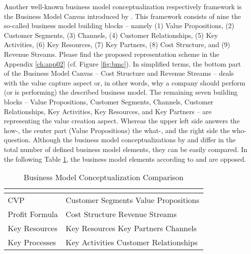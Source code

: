 Another well-known business model conceptualization respectively framework is the Business Model Canvas introduced by \citet{Osterwalder2010}. This framework consists of nine the so-called business model building blocks -- namely (1) Value Propositions, (2) Customer Segments, (3) Channels, (4) Customer Relationships, (5) Key Activities, (6) Key Resources, (7) Key Partners, (8) Cost Structure, and (9) Revenue Streams. Please find the proposed representation scheme in the Appendix \ref{ch:app02} (cf. Figure \ref{fig:bmc}). In simplified terms, the bottom part of the Business Model Canvas -- Cost Structure and Revenue Streams -- deals with the value capture aspect or, in other words, why a company should perform (or is performing) the described business model. The remaining seven building blocks -- Value Propositions, Customer Segments, Channels, Customer Relationships, Key Activities, Key Resources, and Key Partners -- are representing the value creation aspect. Whereas the upper left side answers the how-, the center part (Value Propositions) the what-, and the right side the who-question. Although the business model conceptualizations by \citet{Johnson2008} and \citet{Osterwalder2010} differ in the total number of defined business model elements, they can be easily compared. In the following Table \ref{tab:bmcc}, the business model elements according to \citet{Johnson2008} and \citet{Osterwalder2010} are opposed.

\begin{table}[h]
	\centering
	\begin{tabular}{lp{}}
			\citet{Johnson2008} & \citet{Osterwalder2010}\\ \hline
			\ac{CVP}	& Customer Segments \newline Value Propositions\\ \hline
			Profit Formula	& Cost Structure \newline	Revenue Streams\\ \hline
			Key Resources	& Key Resources \newline Key Partners \newline Channels\\ \hline
			Key Processes	& Key Activities \newline	Customer Relationships
	\end{tabular}
	\caption{Business Model Conceptualization Comparison}
	\label{tab:bmcc}
\end{table}

